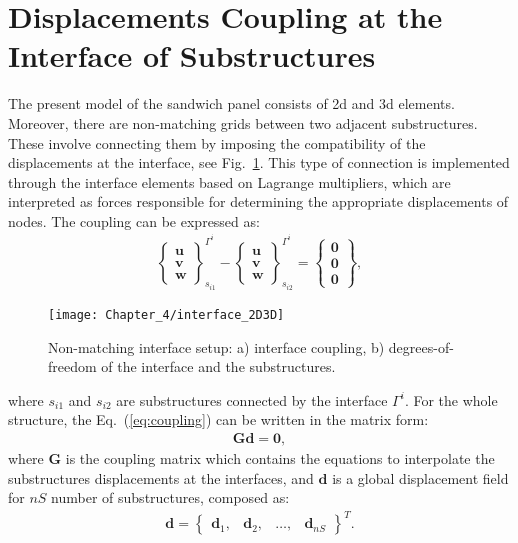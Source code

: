 \section{Displacements Coupling at the Interface of Substructures}
\label{sec:interface}


The present model of the sandwich panel consists of \ac{2d} and \ac{3d} elements. 
Moreover, there are non-matching grids between two adjacent substructures. 
These involve connecting them by imposing the compatibility of the displacements at the interface, see Fig.~\ref{fig:interface}.
This type of connection is implemented through the interface elements based on Lagrange multipliers, which are interpreted as forces responsible for determining the appropriate displacements of nodes.
The coupling can be expressed as:
\begin{eqnarray}
	\left\{\begin{array}{c}
		\textbf{u}\\
		\textbf{v}\\
		\textbf{w}
	\end{array}\right\}_{s_{i1}}^{\Gamma^i}-
	\left\{\begin{array}{c}
		\textbf{u}\\
		\textbf{v}\\
		\textbf{w}
	\end{array}\right\}_{s_{i2}}^{\Gamma^i}=
	\left\{\begin{array}{c}
		\textbf{0}\\
		\textbf{0}\\
		\textbf{0}
	\end{array}\right\},
	\label{eq:coupling}
\end{eqnarray}
\begin{figure}
	\begin{center}
		\texttt{[image: Chapter\_4/interface\_2D3D]}
	\end{center}
	\caption{Non-matching interface setup: a) interface coupling, b) degrees-of-freedom of the interface and the substructures.}
	\label{fig:interface}
\end{figure}
where \(s_{i1}\) and \(s_{i2}\) are substructures connected by the interface \(\Gamma^i\). For the whole structure, the Eq.~(\ref{eq:coupling}) can be written in the matrix form:
\begin{eqnarray}
	\textbf{G}\textbf{d}=\textbf{0},
	\label{eq:cond_disp}
\end{eqnarray}
where \textbf{G} is the coupling matrix which contains the equations to interpolate the substructures displacements at the interfaces, and \(\textbf{d}\) is a global displacement field for \(nS\) number of substructures, composed as:
\begin{eqnarray}
	\textbf{d} = \left\{\begin{array}{cccc}
		\textbf{d}_1, & \textbf{d}_2, &\ldots, & \textbf{d}_{nS}
	\end{array}\right\}^T.
	\label{eq:displacements}
\end{eqnarray}

